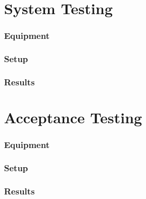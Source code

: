 \section{System Testing}
 
\subsubsection{Equipment}

\subsubsection{Setup}

\subsubsection{Results}
 
\section{Acceptance Testing}
 
\subsubsection{Equipment}
 
\subsubsection{Setup}
 
\subsubsection{Results}
 




